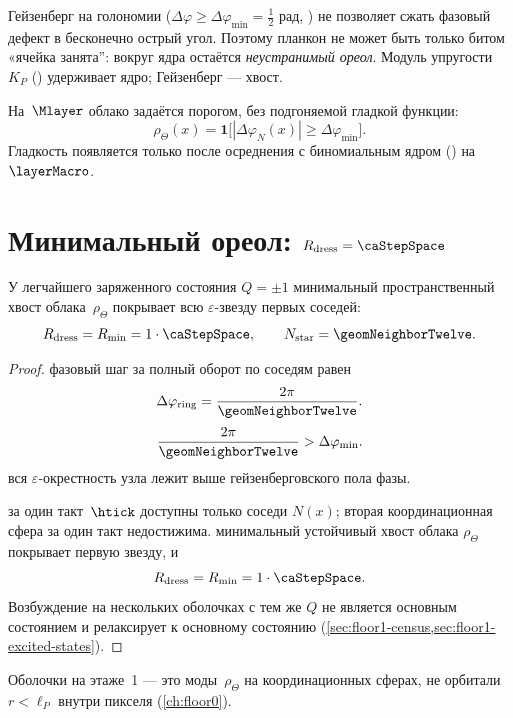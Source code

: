Гейзенберг на голономии ($\Delta\varphi\geq\Delta\varphi_{\min}=\tfrac12$ рад,
) не позволяет сжать фазовый дефект в бесконечно острый угол.
Поэтому планкон не может быть только битом «ячейка занята'':
вокруг ядра остаётся \emph{неустранимый ореол}.
Модуль упругости~$K_P$ () удерживает ядро; Гейзенберг --- хвост.

На~$\Mlayer$ облако задаётся порогом, без подгоняемой гладкой функции:
\[
  \rho_\Theta(x)=\mathbf{1}\big[|\Delta\varphi_N(x)|\geq\Delta\varphi_{\min}\big].
\]
Гладкость появляется только после осреднения с биномиальным ядром () на~$\layerMacro$.

\section{Минимальный ореол: \texorpdfstring{$R_{\mathrm{dress}}=\caStepSpace$}{R=dl}}
\label{sec:floor1-dressing}

\begin{proposition}
\label{prop:floor1-dress-radius}
У легчайшего заряженного состояния $Q=\pm1$ минимальный пространственный хвост
облака~$\rho_\Theta$ покрывает всю $\varepsilon$-звезду первых соседей:
\[
  R_{\mathrm{dress}}=R_{\min}=1\cdot\caStepSpace,\qquad N_{\mathrm{star}}=\geomNeighborTwelve.
\]
\end{proposition}

\begin{proof}
фазовый шаг за полный оборот по соседям равен
\[
  \Delta\varphi_{\mathrm{ring}}=\frac{2\pi}{\geomNeighborTwelve}.
\]
\[
  \frac{2\pi}{\geomNeighborTwelve}>\Delta\varphi_{\min}.
\]
\pfollows
вся $\varepsilon$-окрестность узла лежит выше гейзенберговского пола фазы.

за один такт~$\htick$ доступны только соседи $N(x)$;
вторая координационная сфера за один такт недостижима.
\phence минимальный устойчивый хвост облака $\rho_\Theta$ покрывает первую звезду, и
\[
  R_{\mathrm{dress}}=R_{\min}=1\cdot\caStepSpace.
\]
Возбуждение на нескольких оболочках с тем же $Q$ не является основным состоянием
и релаксирует к основному состоянию (\cref{sec:floor1-census,sec:floor1-excited-states}).
\end{proof}

Оболочки на этаже~1 --- это моды~$\rho_\Theta$ на координационных сферах,
не орбитали $r<\ell_P$ внутри пикселя (\cref{ch:floor0}).


